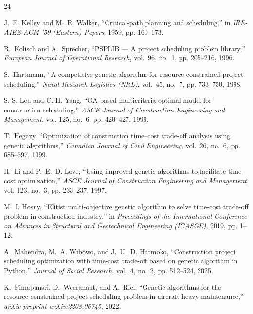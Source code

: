 \documentclass[conference]{IEEEtran}
\begin{document}
\begin{thebibliography}{24}

J.~E. Kelley and M.~R. Walker, ``Critical-path planning and scheduling,'' in \emph{IRE-AIEE-ACM '59 (Eastern) Papers}, 1959, pp. 160--173.

R.~Kolisch and A.~Sprecher, ``{PSPLIB} --- {A} project scheduling problem library,'' \emph{European Journal of Operational Research}, vol.~96, no.~1, pp. 205--216, 1996.

S.~Hartmann, ``A competitive genetic algorithm for resource-constrained project scheduling,'' \emph{Naval Research Logistics (NRL)}, vol.~45, no.~7, pp. 733--750, 1998.

S.-S. Leu and C.-H. Yang, ``{GA}-based multicriteria optimal model for construction scheduling,'' \emph{ASCE Journal of Construction Engineering and Management}, vol. 125, no.~6, pp. 420--427, 1999.

T.~Hegazy, ``Optimization of construction time--cost trade-off analysis using genetic algorithms,'' \emph{Canadian Journal of Civil Engineering}, vol.~26, no.~6, pp. 685--697, 1999.

H.~Li and P.~E.~D. Love, ``Using improved genetic algorithms to facilitate time-cost optimization,'' \emph{ASCE Journal of Construction Engineering and Management}, vol. 123, no.~3, pp. 233--237, 1997.

M.~I. Hosny, ``Elitist multi-objective genetic algorithm to solve time-cost trade-off problem in construction industry,'' in \emph{Proceedings of the International Conference on Advances in Structural and Geotechnical Engineering (ICASGE)}, 2019, pp. 1--12.

A.~Mahendra, M.~A. Wibowo, and J.~U.~D. Hatmoko, ``Construction project scheduling optimization with time-cost trade-off based on genetic algorithm in {Python},'' \emph{Journal of Social Research}, vol.~4, no.~2, pp. 512--524, 2025.

K.~Pimapunsri, D.~Weeranant, and A.~Riel, ``Genetic algorithms for the resource-constrained project scheduling problem in aircraft heavy maintenance,'' \emph{arXiv preprint arXiv:2208.06745}, 2022.


\end{thebibliography}
\end{document}
